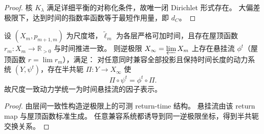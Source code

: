 \begin{proof}
核 \(K_\lambda\) 满足详细平衡的对称化条件，故唯一闭 Dirichlet 形式存在。
大偏差极限下，达到时间的指数率函数等于最短作用量，即 \(d_C\)。
\end{proof}

\begin{theorem}[时间悬挂流的普适性]\label{thm:xi-suspension-flow-universality}
设 \((X_m,p_{m+1,m})\) 为尺度塔，\(\widetilde\ell_m\) 为各层严格可加时间，且存在屋顶函数 \(r_m:X_m\to\mathbb R_{>0}\) 与时间推进一致。
则逆极限 \(X_\infty=\varprojlim X_m\) 上存在悬挂流 \(\phi^t\)（屋顶函数 \(r=\lim r_m\)），满足：
对任意同时兼容全部投影且保持时间长度的动力系统 \((Y,\psi^t)\)，存在半共轭 \(\Pi:Y\to X_\infty\) 使
\[
\Pi\circ\psi^t=\phi^t\circ\Pi.
\]
故尺度一致动力学统一为时间悬挂流的因子表示。
\end{theorem}

\begin{proof}
由层间一致性构造逆极限上的可测 return-time 结构。
悬挂流由该 return map 与屋顶函数标准生成。
任意兼容系统都诱导到同一逆极限坐标，得到半共轭交换关系。
\end{proof}
